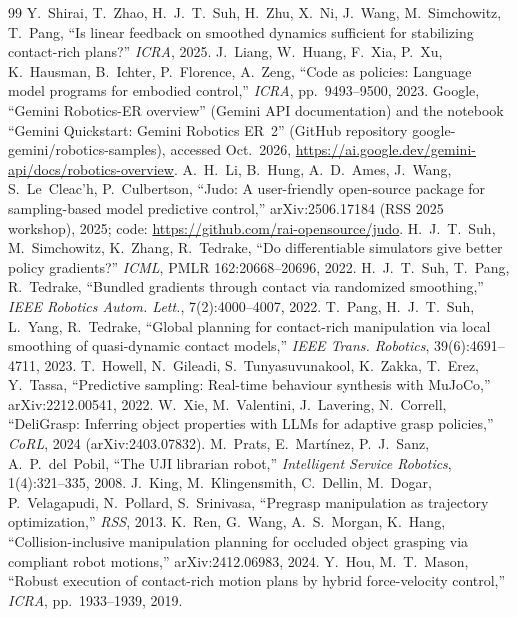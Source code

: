 \documentclass[10pt,twocolumn]{article}
\begin{document}
{\begin{thebibliography}{99}
 Y.~Shirai, T.~Zhao, H.~J.~T.~Suh, H.~Zhu, X.~Ni, J.~Wang, M.~Simchowitz, T.~Pang, ``Is linear feedback on smoothed dynamics sufficient for stabilizing contact-rich plans?'' \emph{ICRA}, 2025.
 J.~Liang, W.~Huang, F.~Xia, P.~Xu, K.~Hausman, B.~Ichter, P.~Florence, A.~Zeng, ``Code as policies: Language model programs for embodied control,'' \emph{ICRA}, pp.~9493--9500, 2023.
 Google, ``Gemini Robotics-ER overview'' (Gemini API documentation) and the notebook ``Gemini Quickstart: Gemini Robotics ER~2'' (GitHub repository google-gemini/robotics-samples), accessed Oct.~2026, \url{https://ai.google.dev/gemini-api/docs/robotics-overview}.
 A.~H.~Li, B.~Hung, A.~D.~Ames, J.~Wang, S.~Le~Cleac'h, P.~Culbertson, ``Judo: A user-friendly open-source package for sampling-based model predictive control,'' arXiv:2506.17184 (RSS 2025 workshop), 2025; code: \url{https://github.com/rai-opensource/judo}.
 H.~J.~T.~Suh, M.~Simchowitz, K.~Zhang, R.~Tedrake, ``Do differentiable simulators give better policy gradients?'' \emph{ICML}, PMLR 162:20668--20696, 2022.
 H.~J.~T.~Suh, T.~Pang, R.~Tedrake, ``Bundled gradients through contact via randomized smoothing,'' \emph{IEEE Robotics Autom. Lett.}, 7(2):4000--4007, 2022.
 T.~Pang, H.~J.~T.~Suh, L.~Yang, R.~Tedrake, ``Global planning for contact-rich manipulation via local smoothing of quasi-dynamic contact models,'' \emph{IEEE Trans. Robotics}, 39(6):4691--4711, 2023.
 T.~Howell, N.~Gileadi, S.~Tunyasuvunakool, K.~Zakka, T.~Erez, Y.~Tassa, ``Predictive sampling: Real-time behaviour synthesis with MuJoCo,'' arXiv:2212.00541, 2022.
 W.~Xie, M.~Valentini, J.~Lavering, N.~Correll, ``DeliGrasp: Inferring object properties with LLMs for adaptive grasp policies,'' \emph{CoRL}, 2024 (arXiv:2403.07832).
 M.~Prats, E.~Mart\'inez, P.~J.~Sanz, A.~P.~del~Pobil, ``The UJI librarian robot,'' \emph{Intelligent Service Robotics}, 1(4):321--335, 2008.
 J.~King, M.~Klingensmith, C.~Dellin, M.~Dogar, P.~Velagapudi, N.~Pollard, S.~Srinivasa, ``Pregrasp manipulation as trajectory optimization,'' \emph{RSS}, 2013.
 K.~Ren, G.~Wang, A.~S.~Morgan, K.~Hang, ``Collision-inclusive manipulation planning for occluded object grasping via compliant robot motions,'' arXiv:2412.06983, 2024.
 Y.~Hou, M.~T.~Mason, ``Robust execution of contact-rich motion plans by hybrid force-velocity control,'' \emph{ICRA}, pp.~1933--1939, 2019.

\end{thebibliography}}
\end{document}
